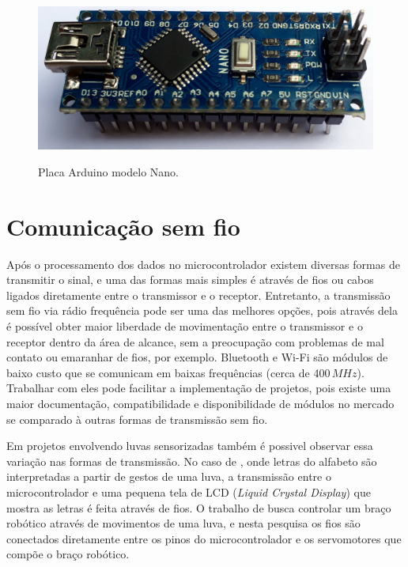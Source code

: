 \documentclass[
	12pt,				%
	openright,			%
	oneside,			%
	a4paper,			%
	english,			%
	brazil				%
	]{abntex2}
\begin{document}
		\begin{figure}[h!]
			\centering
			\caption{Placa Arduino modelo Nano.}
  		\includegraphics[width=12cm]{./figures/arduino-nano1.jpg}
  		\label{Fig:arduino-nano1}
		\end{figure}



	


		\section{Comunicação sem fio}
		
		Após o processamento dos dados no microcontrolador existem diversas formas de transmitir o sinal, e uma das formas mais simples é através de fios ou cabos ligados diretamente entre o transmissor e o receptor. Entretanto, a transmissão sem fio via rádio frequência pode ser uma das melhores opções, pois através dela é possível obter maior liberdade de movimentação entre o transmissor e o receptor dentro da área de alcance, sem a preocupação com problemas de mal contato ou emaranhar de fios, por exemplo. Bluetooth e Wi-Fi são módulos de baixo custo que se comunicam em baixas frequências (cerca de 400$\,MHz$). Trabalhar com eles pode facilitar a implementação de projetos, pois existe uma maior documentação, compatibilidade e disponibilidade de módulos no mercado se comparado à outras formas de transmissão sem fio.
		
		Em projetos envolvendo luvas sensorizadas também é possivel observar essa variação nas formas de transmissão. No caso de \cite{solanki2013sign}, onde letras do alfabeto são interpretadas a partir de gestos de uma luva, a transmissão entre o microcontrolador e uma pequena tela de LCD (\textit{Liquid Crystal Display})  que mostra as letras é feita através de fios. O trabalho de \cite{syed2012armcontroller} busca controlar um braço robótico através de movimentos de uma luva, e nesta pesquisa os fios são conectados diretamente entre os pinos do microcontrolador e os servomotores que compõe o braço robótico.
\end{document}
